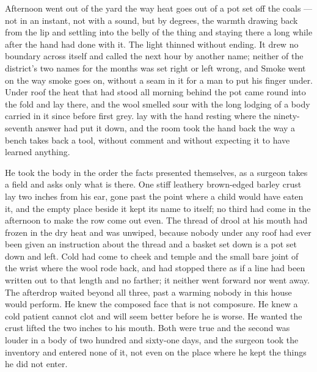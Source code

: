 Afternoon went out of the yard the way heat goes out of a pot set off the coals --- not in an instant, not with a sound, but by degrees, the warmth drawing back from the lip and settling into the belly of the thing and staying there a long while after the hand had done with it. The light thinned without ending. It drew no boundary across itself and called the next hour by another name; neither of the district's two names for the months was set right or left wrong, and Smoke went on the way smoke goes on, without a seam in it for a man to put his finger under. Under  roof the heat that had stood all morning behind the pot came round into the fold and lay there, and the wool smelled sour with the long lodging of a body carried in it since before first grey.  lay with the hand resting where the ninety-seventh answer had put it down, and the room took the hand back the way a bench takes back a tool, without comment and without expecting it to have learned anything.

He took the body in the order the facts presented themselves, as a surgeon takes a field and asks only what is there. One stiff leathery brown-edged barley crust lay two inches from his ear, gone past the point where a child would have eaten it, and the empty place beside it kept its name to itself; no third had come in the afternoon to make the row come out even. The thread of drool at his mouth had frozen in the dry heat and was unwiped, because nobody under any roof had ever been given an instruction about the thread and a basket set down is a pot set down and left. Cold had come to cheek and temple and the small bare joint of the wrist where the wool rode back, and had stopped there as if a line had been written out to that length and no farther; it neither went forward nor went away. The afterdrop waited beyond all three, past a warming nobody in this house would perform. He knew the composed face that is not composure. He knew a cold patient cannot clot and will seem better before he is worse. He wanted the crust lifted the two inches to his mouth. Both were true and the second was louder in a body of two hundred and sixty-one days, and the surgeon took the inventory and entered none of it, not even on the place where he kept the things he did not enter.

